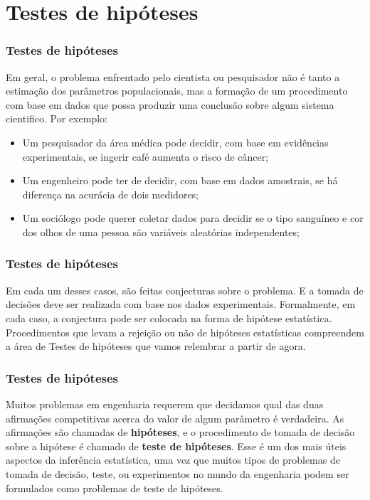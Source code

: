 \documentclass[14pt,aspectratio=1610]{beamer}
\begin{document}
\section{Testes de hipóteses}
\begin{frame}{}
\frametitle{Testes de hipóteses}
\begin{block}{}
\justifying
Em geral, o problema enfrentado pelo cientista ou pesquisador não é tanto a estimação dos parâmetros populacionais, mas a formação de um procedimento com base 
em dados que possa produzir uma conclusão sobre algum sistema cientifico. Por exemplo:
\begin{itemize}
    \item Um pesquisador da área médica pode decidir, com base em evidências experimentais, se ingerir café aumenta o risco de câncer;\pause
    \item Um engenheiro pode ter de decidir, com base em dados amostrais, se há diferença na acurácia de dois medidores;\pause
    \item Um sociólogo pode querer coletar dados para decidir se o tipo sanguíneo e cor dos olhos de uma pessoa são variáveis aleatórias independentes;
\end{itemize}
\end{block}
\end{frame}

\begin{frame}{}
\frametitle{Testes de hipóteses}
\begin{block}{}
\justifying
Em cada um desses casos, são feitas conjecturas sobre o problema. E a tomada de decisões deve ser realizada com base nos dados experimentais. Formalmente, 
em cada caso, a conjectura pode ser colocada na forma de hipótese estatística. Procedimentos que levam a rejeição ou não de hipóteses estatísticas compreendem 
a área de Testes de hipóteses que vamos relembrar a partir de agora.
 \end{block}
\end{frame}

\begin{frame}{}
\frametitle{Testes de hipóteses}
\begin{block}{}
\justifying
Muitos problemas em engenharia requerem que decidamos qual das duas afirmações competitivas acerca do valor de algum parâmetro é verdadeira. As afirmações 
são chamadas de \textbf{hipóteses}, e o procedimento de tomada de decisão sobre a hipótese é chamado de \textbf{teste de hipóteses}. Esse é um dos mais úteis 
aspectos da inferência estatística, uma vez que muitos tipos de problemas de tomada de decisão, teste, ou experimentos no mundo da engenharia podem ser formulados 
como problemas de teste de hipóteses.
\end{block}
\end{frame}
\end{document}
